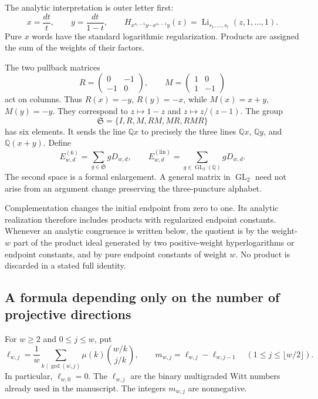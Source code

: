 The analytic interpretation is outer letter first:
\[
 x=\frac{dt}{t},\qquad y=\frac{dt}{1-t},\qquad
 H_{x^{s_1-1}y\cdots x^{s_r-1}y}(z)
   =\operatorname{Li}_{s_1,\ldots,s_r}(z,1,\ldots,1).
\]
Pure $x$ words have the standard logarithmic regularization. Products
are assigned the sum of the weights of their factors.

The two pullback matrices
\begin{equation}\label{gorbit:eq:matrices}
 R=\begin{pmatrix}0&-1\\-1&0\end{pmatrix},\qquad
 M=\begin{pmatrix}1&0\\1&-1\end{pmatrix}
\end{equation}
act on columns. Thus $R(x)=-y$, $R(y)=-x$, while
$M(x)=x+y$, $M(y)=-y$. They correspond to $z\mapsto1-z$ and
$z\mapsto z/(z-1)$. The group
\[
 \mathfrak S=\{I,R,M,RM,MR,RMR\}
\]
has six elements. It sends the line $\mathbb Qx$ to precisely the
three lines $\mathbb Qx$, $\mathbb Qy$, and $\mathbb Q(x+y)$.
Define
\[
 E^{(6)}_{w,d}=\sum_{g\in\mathfrak S}gD_{w,d},\qquad
 E^{(\mathrm{lin})}_{w,d}
    =\sum_{g\in\operatorname{GL}_2(\mathbb Q)}gD_{w,d}.
\]
The second space is a formal enlargement. A general matrix in
$\operatorname{GL}_2$ need not arise from an argument change preserving
the three-puncture alphabet.

Complementation changes the initial endpoint from zero to one.
Its analytic realization therefore includes products with regularized
endpoint constants. Whenever an analytic congruence is written below,
the quotient is by the weight-$w$ part of the product ideal generated by
two positive-weight hyperlogarithms or endpoint constants, and by pure
endpoint constants of weight $w$. No product is discarded in a stated
full identity.

\subsection{A formula depending only on the number of projective directions}

For $w\ge2$ and $0\le j\le w$, put
\begin{equation}\label{gorbit:eq:witt}
 \ell_{w,j}=\frac1w\sum_{k\mid\gcd(w,j)}
       \mu(k)\binom{w/k}{j/k},\qquad
 m_{w,j}=\ell_{w,j}-\ell_{w,j-1}\quad
       (1\le j\le\lfloor w/2\rfloor).
\end{equation}
In particular, $\ell_{w,0}=0$. The $\ell_{w,j}$ are the binary
multigraded Witt numbers already used in the manuscript. The integers
$m_{w,j}$ are nonnegative.

